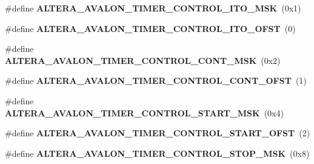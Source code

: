 \begin{DoxyCompactItemize}
\item 
\mbox{\label{group__RTEMSBSPsNios2ISS_ga202871f11df7188ead8d9c72dff79791}} 
\#define {\bfseries A\+L\+T\+E\+R\+A\+\_\+\+A\+V\+A\+L\+O\+N\+\_\+\+T\+I\+M\+E\+R\+\_\+\+C\+O\+N\+T\+R\+O\+L\+\_\+\+I\+T\+O\+\_\+\+M\+SK}~(0x1)
\item 
\mbox{\label{group__RTEMSBSPsNios2ISS_gadae2dd7e98da222d25b0032260f203c3}} 
\#define {\bfseries A\+L\+T\+E\+R\+A\+\_\+\+A\+V\+A\+L\+O\+N\+\_\+\+T\+I\+M\+E\+R\+\_\+\+C\+O\+N\+T\+R\+O\+L\+\_\+\+I\+T\+O\+\_\+\+O\+F\+ST}~(0)
\item 
\mbox{\label{group__RTEMSBSPsNios2ISS_gad5f731c96d9a508b182f2d8ef72f3bb9}} 
\#define {\bfseries A\+L\+T\+E\+R\+A\+\_\+\+A\+V\+A\+L\+O\+N\+\_\+\+T\+I\+M\+E\+R\+\_\+\+C\+O\+N\+T\+R\+O\+L\+\_\+\+C\+O\+N\+T\+\_\+\+M\+SK}~(0x2)
\item 
\mbox{\label{group__RTEMSBSPsNios2ISS_gaa530da851d79975f28fee60463c76bb2}} 
\#define {\bfseries A\+L\+T\+E\+R\+A\+\_\+\+A\+V\+A\+L\+O\+N\+\_\+\+T\+I\+M\+E\+R\+\_\+\+C\+O\+N\+T\+R\+O\+L\+\_\+\+C\+O\+N\+T\+\_\+\+O\+F\+ST}~(1)
\item 
\mbox{\label{group__RTEMSBSPsNios2ISS_ga3960c0779c5dc8990f190dcf14457626}} 
\#define {\bfseries A\+L\+T\+E\+R\+A\+\_\+\+A\+V\+A\+L\+O\+N\+\_\+\+T\+I\+M\+E\+R\+\_\+\+C\+O\+N\+T\+R\+O\+L\+\_\+\+S\+T\+A\+R\+T\+\_\+\+M\+SK}~(0x4)
\item 
\mbox{\label{group__RTEMSBSPsNios2ISS_ga7e87089e68d07e1f1a10d6ca04a5ae53}} 
\#define {\bfseries A\+L\+T\+E\+R\+A\+\_\+\+A\+V\+A\+L\+O\+N\+\_\+\+T\+I\+M\+E\+R\+\_\+\+C\+O\+N\+T\+R\+O\+L\+\_\+\+S\+T\+A\+R\+T\+\_\+\+O\+F\+ST}~(2)
\item 
\mbox{\label{group__RTEMSBSPsNios2ISS_gac45d61b1629561fa07c188bee9fbe584}} 
\#define {\bfseries A\+L\+T\+E\+R\+A\+\_\+\+A\+V\+A\+L\+O\+N\+\_\+\+T\+I\+M\+E\+R\+\_\+\+C\+O\+N\+T\+R\+O\+L\+\_\+\+S\+T\+O\+P\+\_\+\+M\+SK}~(0x8)
\item 
\mbox{\label{group__RTEMSBSPsNios2ISS_ga24b3396b332a1a7e02769cc1feaad564}} 

\end{DoxyCompactItemize}
